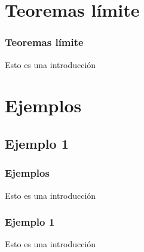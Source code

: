 \documentclass{beamer}
\begin{document}
\section{Teoremas límite}
\begin{frame}
    \frametitle{Teoremas límite}
    Esto es una introducción
\end{frame}

\section{Ejemplos}
\subsection{Ejemplo 1}
\begin{frame}
    \frametitle{Ejemplos}
    Esto es una introducción
\end{frame}
\begin{frame}
    \frametitle{Ejemplo 1}
    Esto es una introducción
\end{frame}
\end{document}
